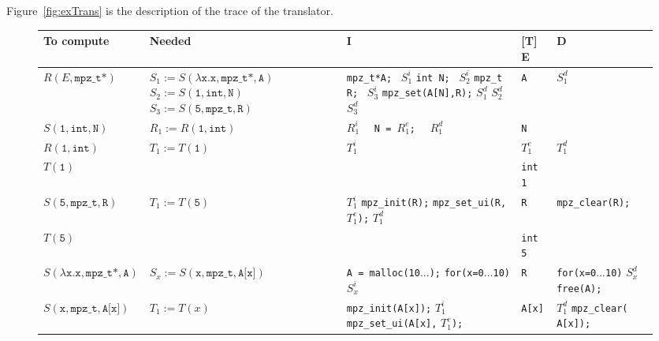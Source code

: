 \documentclass[12pt,a4paper]{article}
\newcommand{\cl}[1]{\texttt{#1}}
\begin{document}
Figure~\ref{fig:exTrans} is the description of the trace of the translator.

\begin{figure}
\begin{tabular}{|p{3.2cm}|p{4.5cm}|p{3.9cm}|p{1.2cm}|p{2.6cm}|}
\hline
To compute & Needed & I & [T] E & D  \\ \hline
$ R(E, \cl{mpz\_t*})$ &
$S_1 := S(\cl{$\lambda$x.x}, \cl{mpz\_t*}, \cl{A})$ \newline
$S_2 := S(\cl{1}, \cl{int}, \cl{N})$ \newline
$S_3 := S(\cl{5}, \cl{mpz\_t}, \cl{R})$ &
\cl{mpz\_t*A;} \ $S_1^i$ \newline
\cl{int N;} \ $S_2^i$ \newline
\cl{mpz\_t R;} \ $S_3^i$ \newline
\cl{mpz\_set(A[N],R);} \newline
$S_1^d$ $S_2^d$ $S_3^d$
& \cl{A} & $S_1^d$ \\ \hline

$S(\cl{1}, \cl{int}, \cl{N})$ &
$R_1 := R(\cl{1}, \cl{int})$ &
$R_1^i$ \ \ \cl{N = $R_1^e$;} \ \ $R_1^d$ &
\cl{N} & \\ \hline

$R(\cl{1}, \cl{int})$ &
$T_1 := T(\cl{1})$ &
$T_1^i$ & $T_1^e$ & $T_1^d$ \\ \hline

$T(\cl{1})$ & & & \cl{int 1} & \\ \hline

$S(\cl{5}, \cl{mpz\_t}, \cl{R})$ &
$T_1 := T(\cl{5})$ &
$T_1^i$ \newline
\cl{mpz\_init(R);} \newline
\cl{mpz\_set\_ui(R, $T_1^e$);} \newline
$T_1^d$
& \cl{R} &
\cl{mpz\_clear(R);} \\ \hline

$T(\cl{5})$ & & & \cl{int 5} & \\ \hline

$S(\lambda\cl{x}.\cl{x},\cl{mpz\_t*},\cl{A})$ &
$S_x := S(\cl{x}, \cl{mpz\_t}, \cl{A[x]})$ &
\cl{A = malloc(10$...$);} \newline
\cl{for(x=0$...$10)} \newline
\phantom{tes } $S_x^i$
& \cl{R} &
\cl{for(x=0$...$10)} \newline
\phantom{tes } $S_x^d$ \newline
\cl{free(A);} \\ \hline

$S(\cl{x},\cl{mpz\_t},\cl{A[x]})$ & $T_1 := T(x)$ & 
\cl{mpz\_init(A[x]);} \newline
$T_1^i$ \newline
\cl{mpz\_set\_ui(A[x],} \newline
\phantom{mmmmmmmmi} \cl{$T_1^e$); }
& \cl{A[x]} &
$T_1^d$ \newline
\cl{mpz\_clear(} \newline 
\phantom{mmmi} \cl{A[x]);}
 \\ \hline


\end{tabular}
\end{figure}
\end{document}
